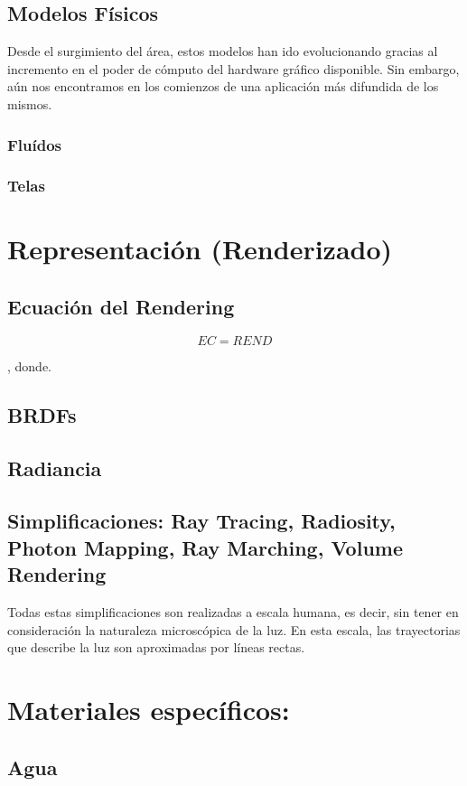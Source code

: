 \documentclass[spanish,a4paper,11pt,oneside,links]{report}
\begin{document}
\subsection{Modelos Físicos}
Desde el surgimiento del área, estos modelos han ido evolucionando gracias al incremento en el poder de cómputo del hardware gráfico disponible. Sin embargo, aún nos encontramos en los comienzos de una aplicación más difundida de los mismos.
\subsubsection{Fluídos}
\subsubsection{Telas}

\section{Representación (Renderizado)}
\subsection{Ecuación del Rendering}

\begin{equation}
EC  = REND
\end{equation}

, donde.


\subsection{BRDFs}
\subsection{Radiancia}
\subsection{Simplificaciones: Ray Tracing, Radiosity, Photon Mapping, Ray Marching, Volume Rendering }
Todas estas simplificaciones son realizadas a escala humana, es decir, sin tener en consideración la naturaleza microscópica de la luz. En esta escala, las trayectorias que describe la luz son aproximadas por líneas rectas.
\section{Materiales específicos:}
\subsection{Agua}
\end{document}
